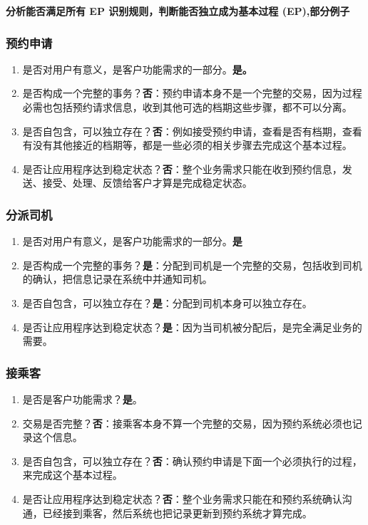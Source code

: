 \textbf{分析能否满足所有 EP 识别规则，判断能否独立成为基本过程
(EP),部分例子}

\hypertarget{ux9884ux7ea6ux7533ux8bf7}{%
\subsubsection{预约申请}\label{ux9884ux7ea6ux7533ux8bf7}}

\begin{enumerate}
\tightlist
\item
  是否对用户有意义，是客户功能需求的一部分。\textbf{是。}
\item
  是否构成一个完整的事务？\textbf{否}：预约申请本身不是一个完整的交易，因为过程必需也包括预约请求信息，收到其他可选的档期这些步骤，都不可以分离。
\item
  是否自包含，可以独立存在？\textbf{否}：例如接受预约申请，查看是否有档期，查看有没有其他接近的档期等，都是一些必须的相关步骤去完成这个基本过程。
\item
  是否让应用程序达到稳定状态？\textbf{否}：整个业务需求只能在收到预约信息，发送、接受、处理、反馈给客户才算是完成稳定状态。
\end{enumerate}

\hypertarget{ux5206ux6d3eux53f8ux673a}{%
\subsubsection{分派司机}\label{ux5206ux6d3eux53f8ux673a}}

\begin{enumerate}
\tightlist
\item
  是否对用户有意义，是客户功能需求的一部分。\textbf{是}
\item
  是否构成一个完整的事务？\textbf{是}：分配到司机是一个完整的交易，包括收到司机的确认，把信息记录在系统中并通知司机。
\item
  是否自包含，可以独立存在？\textbf{是}：分配到司机本身可以独立存在。
\item
  是否让应用程序达到稳定状态？\textbf{是}：因为当司机被分配后，是完全满足业务的需要。
\end{enumerate}

\hypertarget{ux63a5ux4e58ux5ba2}{%
\subsubsection{接乘客}\label{ux63a5ux4e58ux5ba2}}

\begin{enumerate}
\tightlist
\item
  是否是客户功能需求？\textbf{是}。
\item
  交易是否完整？\textbf{否}：接乘客本身不算一个完整的交易，因为预约系统必须也记录这个信息。
\item
  是否自包含，可以独立存在？\textbf{否}：确认预约申请是下面一个必须执行的过程，来完成这个基本过程。
\item
  是否让应用程序达到稳定状态？\textbf{否}：整个业务需求只能在和预约系统确认沟通，已经接到乘客，然后系统也把记录更新到预约系统才算完成。
\end{enumerate}

